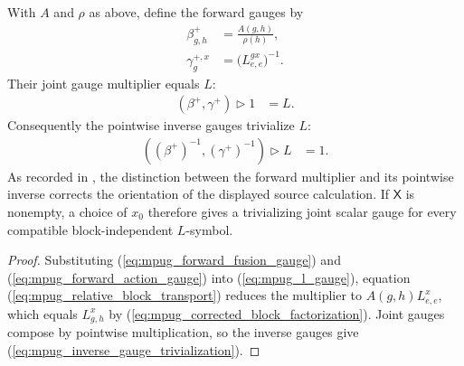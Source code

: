 \begin{lemma}
    \label{thm:mpug_block_independence_inverse_gauge}
    \leanok
    With $A$ and $\rho$ as above, define the forward gauges by
    \begin{align}
        \beta^+_{g,h}
         & =\frac{A(g,h)}{\rho(h)},
        \label{eq:mpug_forward_fusion_gauge} \\
        \gamma^{+,x}_g
         & =\bigl(L^{g x}_{e,e}\bigr)^{-1}.
        \label{eq:mpug_forward_action_gauge}
    \end{align}
    Their joint gauge multiplier equals $L$:
    \begin{align}
        (\beta^+,\gamma^+)\mathbin{\triangleright}1
         & =L.
        \label{eq:mpug_forward_gauge_multiplier}
    \end{align}
    Consequently the pointwise inverse gauges trivialize $L$:
    \begin{align}
        ((\beta^+)^{-1},(\gamma^+)^{-1})
        \mathbin{\triangleright}L
         & =1.
        \label{eq:mpug_inverse_gauge_trivialization}
    \end{align}
    As recorded in \cite{gap:fbc25_block_independence_reciprocal_errors}, the
    distinction between the forward multiplier and its pointwise inverse
    corrects the orientation of the displayed source calculation.
    If $\mathsf X$ is nonempty, a choice of $x_0$ therefore gives a
    trivializing joint scalar gauge for every compatible block-independent
    $L$-symbol.
\end{lemma}
\begin{proof}\leanok
    Substituting (\ref{eq:mpug_forward_fusion_gauge}) and
    (\ref{eq:mpug_forward_action_gauge}) into
    (\ref{eq:mpug_l_gauge}), equation
    (\ref{eq:mpug_relative_block_transport}) reduces the multiplier to
    $A(g,h)L^x_{e,e}$, which equals $L^x_{g,h}$ by
    (\ref{eq:mpug_corrected_block_factorization}). Joint gauges compose by
    pointwise multiplication, so the inverse gauges give
    (\ref{eq:mpug_inverse_gauge_trivialization}).
\end{proof}

